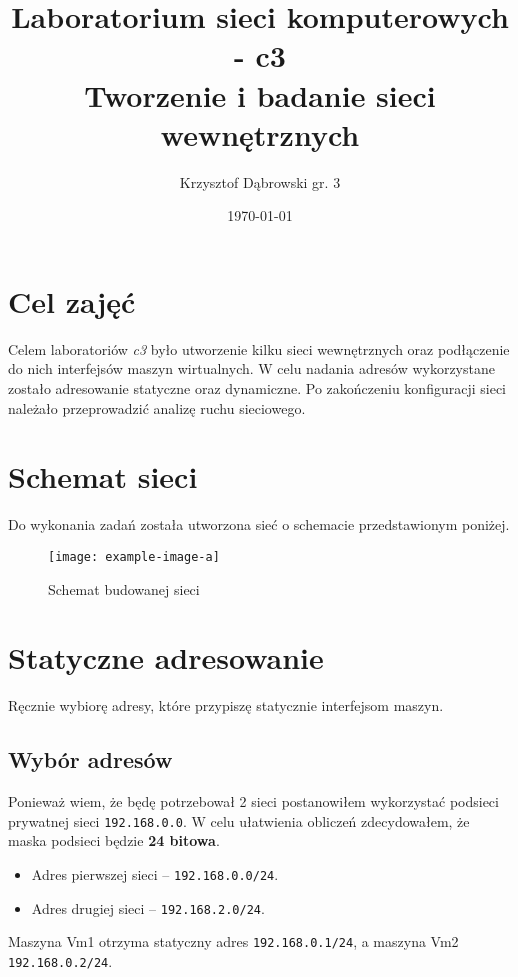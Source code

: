 \documentclass{mwart} %
\title{Laboratorium sieci komputerowych - c3 \\ Tworzenie i badanie sieci wewnętrznych}
\author{Krzysztof Dąbrowski gr. 3}
\date{\today}
\begin{document}
\maketitle{}
\tableofcontents{}

\section{Cel zajęć}
Celem laboratoriów \textit{c3} było utworzenie kilku sieci wewnętrznych oraz podłączenie do nich interfejsów maszyn wirtualnych. W celu nadania adresów wykorzystane zostało adresowanie statyczne oraz dynamiczne. Po zakończeniu konfiguracji sieci należało przeprowadzić analizę ruchu sieciowego.

\section{Schemat sieci}
Do wykonania zadań została utworzona sieć o schemacie przedstawionym poniżej.

\begin{figure}[H]
  \centering
  \texttt{[image: example-image-a]}
  
  \caption{Schemat budowanej sieci}
  \label{fig:SchematSieci}
\end{figure}

\section{Statyczne adresowanie}
Ręcznie wybiorę adresy, które przypiszę statycznie interfejsom maszyn.

\subsection{Wybór adresów}
Ponieważ wiem, że będę potrzebował 2 sieci postanowiłem wykorzystać podsieci prywatnej sieci \texttt{192.168.0.0}. W celu ułatwienia obliczeń zdecydowałem, że maska podsieci będzie \textbf{24 bitowa}.

\begin{itemize}
  \item Adres pierwszej sieci -- \texttt{192.168.0.0/24}.
  \item Adres drugiej sieci -- \texttt{192.168.2.0/24}.
\end{itemize}

Maszyna Vm1 otrzyma statyczny adres \texttt{192.168.0.1/24}, a maszyna Vm2 \texttt{192.168.0.2/24}.
\end{document}

